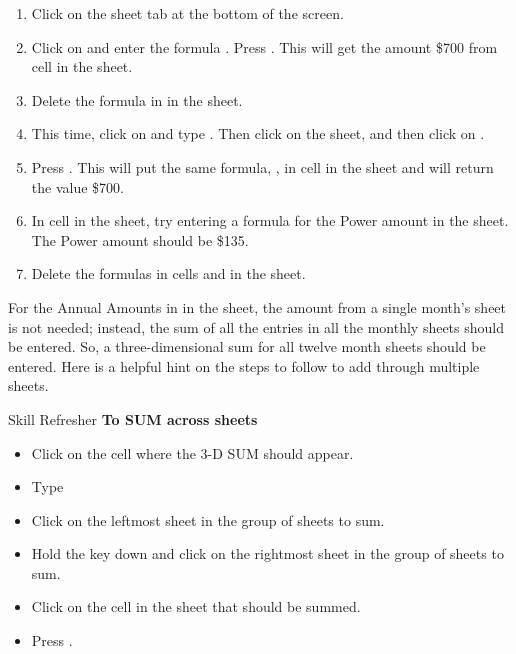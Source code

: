 \begin{enumerate}
	\item Click on the  sheet tab at the bottom of the screen.
	\item Click on  and enter the formula . Press . This will get the amount \$700 from cell  in the  sheet.
	\item Delete the formula in  in the  sheet.
	\item This time, click on  and type \fmtFunction{=}. Then click on the  sheet, and then click on .
	\item Press . This will put the same formula, , in cell  in the  sheet and will return the value \$700.
	\item In cell  in the  sheet, try entering a formula for the Power amount in the  sheet. The Power amount should be \$135.
	\item Delete the formulas in cells  and  in the  sheet.
\end{enumerate}

For the Annual Amounts in  in the  sheet, the amount from a single month's sheet is not needed; instead, the sum of all the entries in all the monthly sheets should be entered. So, a three-dimensional sum for all twelve month sheets should be entered. Here is a helpful hint on the steps to follow to add through multiple sheets.

\begin{center}
	\begin{sklbox}{Skill Refresher}
		\textbf{To SUM across sheets}
		\\
		\begin{itemize}
			\setlength{\itemsep}{0pt}
			\setlength{\parskip}{0pt}
			\setlength{\parsep}{0pt}
			
			\item Click on the cell where the 3-D SUM should appear.
			\item Type 
			\item Click on the leftmost sheet in the group of sheets to sum.
			\item Hold the  key down and click on the rightmost sheet in the group of sheets to sum.
			\item Click on the cell in the sheet that should be summed.
			\item Press .
			
		\end{itemize}
	\end{sklbox}
\end{center}

